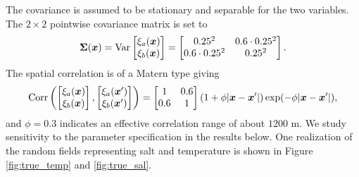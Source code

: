 \documentclass[aoas]{imsart}
\begin{document}

The covariance is assumed to be stationary and separable for the two variables. 
The $2 \times 2$ pointwise covariance matrix is set to
\begin{equation}\label{v0}
\bSigma(\bx)=\mbox{Var} 
\begin{bmatrix}
    \xi_a(\bx) \\
    \xi_b(\bx) 
    \end{bmatrix}=
\begin{bmatrix}
0.25^2 & 0.6 \cdot 0.25^2 \\
0.6 \cdot 0.25^2 & 0.25^2
\end{bmatrix}.
\end{equation}
The spatial correlation is of a Matern type giving
\begin{equation}\label{v}
\mbox{Corr} 
\left(
\begin{bmatrix}
    \xi_a(\bx) \\
    \xi_b(\bx) 
    \end{bmatrix},
    \begin{bmatrix}
    \xi_a(\bx') \\
    \xi_b(\bx') 
    \end{bmatrix}
    \right)
    = \begin{bmatrix}
1 & 0.6  \\
0.6  & 1
\end{bmatrix}(1+\phi |\bx-\bx'|)\exp (-\phi |\bx-\bx'|),
\end{equation}
and $\phi=0.3$ indicates an effective correlation range of about $1200$ m. 
We study sensitivity to the parameter specification in the results below.
One realization of the random fields representing salt and temperature is shown in Figure \ref{fig:true_temp} and \ref{fig:true_sal}.
\end{document}
